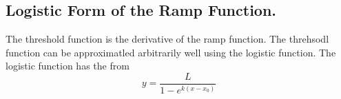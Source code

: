 %
%
%


\chapter{\MakeUppercase{}}

\section{Logistic Form of the Ramp Function. }

The threshold function is the derivative of the ramp function. The
threhsodl function can be approximatled arbitrarily well using the
logistic function. The logistic function has the from
\begin{equation}
    y=\frac{L}{1-e^{k\left(x-x_{0}\right)}}
\end{equation}


\pagebreak{}

